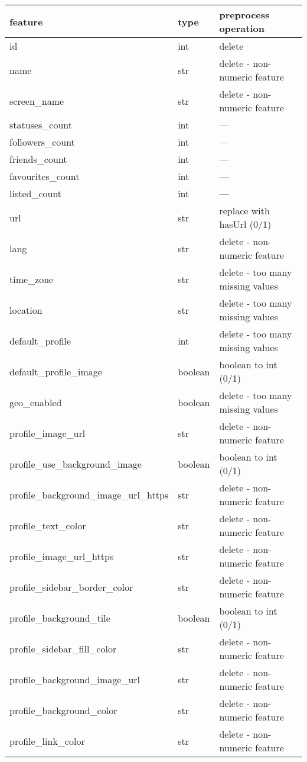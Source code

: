 \begin{center}
	\begin{tabular}{lll}
		\\feature&type&preprocess operation\\
		\hline\hline
		id&int&delete\\
		name&str&delete - non-numeric feature\\
		screen\_name&str&delete - non-numeric feature\\
		statuses\_count&int&---\\
		followers\_count&int&---\\
		friends\_count&int&---\\
		favourites\_count&int&---\\
		listed\_count&int&---\\
		url&str&replace with hasUrl (0/1)\\
		lang&str&delete - non-numeric feature\\
		time\_zone&str&delete - too many missing values\\
		location&str&delete - too many missing values\\
		default\_profile&int&delete - too many missing values\\
		default\_profile\_image&boolean&boolean to int (0/1)\\
		geo\_enabled&boolean&delete - too many missing values\\
		profile\_image\_url&str&delete - non-numeric feature\\
		profile\_use\_background\_image&boolean&boolean to int (0/1)\\
		profile\_background\_image\_url\_https&str&delete - non-numeric feature\\
		profile\_text\_color&str&delete - non-numeric feature\\
		profile\_image\_url\_https&str&delete - non-numeric feature\\
		profile\_sidebar\_border\_color&str&delete - non-numeric feature\\
		profile\_background\_tile&boolean&boolean to int (0/1)\\
		profile\_sidebar\_fill\_color&str&delete - non-numeric feature\\
		profile\_background\_image\_url&str&delete - non-numeric feature\\
		profile\_background\_color&str&delete - non-numeric feature\\
		profile\_link\_color&str&delete - non-numeric feature\\

\end{tabular}
\end{center}
